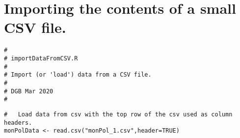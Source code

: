 \documentclass[12pt]{article}
\begin{document}
\Large

\section{Importing the contents of a small CSV file.}
	
	
\begin{lstlisting}
#
# importDataFromCSV.R
# 
# Import (or 'load') data from a CSV file.
#
# DGB Mar 2020
#
\end{lstlisting}

\begin{lstlisting}
#   Load data from csv with the top row of the csv used as column headers.
monPolData <- read.csv("monPol_1.csv",header=TRUE)
\end{lstlisting}


	
\end{document}
